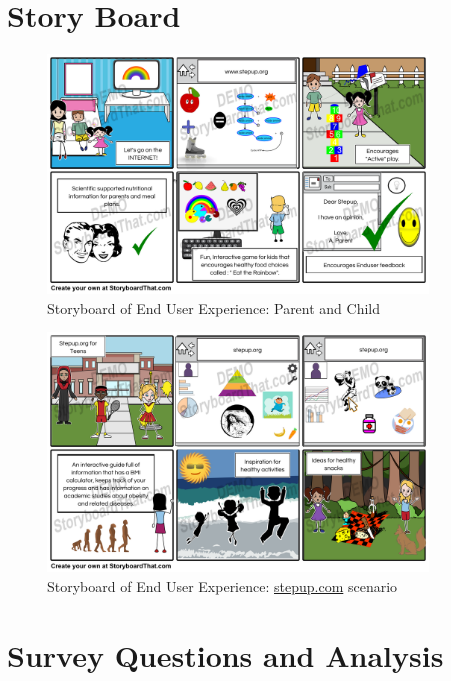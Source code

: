 \documentclass[letterpaper,twoside,12pt]{article}
\begin{document}
\section{Story Board}

\begin{figure}[ht!]
  \centering
  \includegraphics[width=0.9\textwidth]{assets/jpg/parent_and_children_experience}
  \caption{Storyboard of End User Experience: Parent and Child}
  \label{fig:parent-and-children-experience}
\end{figure}
\FloatBarrier
\begin{figure}[ht!]
  \centering
  \includegraphics[width=0.9\textwidth]{assets/jpg/stepup_com_scenario_2}
  \caption{Storyboard of End User Experience: \url{stepup.com} scenario}
  \label{fig:stepup-com-scenario-2}
\end{figure}
\FloatBarrier

\section{Survey Questions and Analysis}
\end{document}
